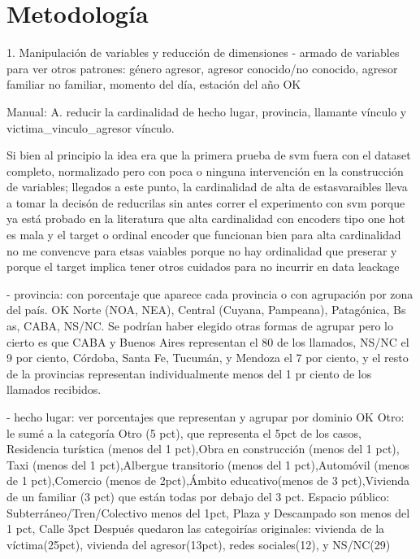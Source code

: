 \documentclass[10pt, spanish]{article}
\begin{document}
\section{Metodología}\label{met}


1. Manipulación de variables y reducción de dimensiones
- armado de variables para ver otros patrones: género agresor, agresor conocido/no conocido, agresor familiar no familiar, momento del día, estación del año OK

Manual:
A. reducir la cardinalidad de hecho lugar, provincia, llamante vínculo y victima_vinculo_agresor vínculo. 

Si bien al principio la idea era que la primera prueba de svm fuera con el dataset completo, normalizado pero con poca o ninguna intervención en la construcción de variables; llegados a este punto, la cardinalidad de alta de estasvaraibles lleva a tomar la decisón de reducrilas sin antes correr el experimento con svm porque ya está probado en la literatura que alta cardinalidad con encoders tipo one hot es mala y el target o ordinal encoder que funcionan bien para alta cardinalidad no me convencve para etsas vaiables porque no hay ordinalidad que preserar y porque el target implica tener otros cuidados para no incurrir en data leackage

- provincia: con porcentaje que aparece cada provincia o con agrupación por zona del país. OK
Norte (NOA, NEA), Central (Cuyana, Pampeana), Patagónica, Bs as, CABA, NS/NC. Se podrían haber elegido otras formas de agrupar pero lo cierto es que CABA y Buenos Aires representan el 80 de los llamados, NS/NC el 9 por ciento, Córdoba, Santa Fe, Tucumán, y Mendoza el 7 por ciento, y el resto de la provincias representan individualmente menos del 1 pr ciento de los llamados recibidos.

- hecho lugar: ver porcentajes que representan y agrupar por dominio OK
Otro: le sumé a la categoría Otro (5 pct), que representa el 5pct de los casos,  Residencia turística (menos del 1 pct),Obra en construcción (menos del 1 pct), Taxi (menos del 1 pct),Albergue transitorio (menos del 1 pct),Automóvil (menos de 1 pct),Comercio (menos de 2pct),Ámbito educativo(menos de 3 pct),Vivienda de un familiar (3 pct) que están todas por debajo del 3 pct.
Espacio público: Subterráneo/Tren/Colectivo menos del 1pct, Plaza y Descampado son menos del 1 pct, Calle 3pct
Después quedaron las categoirías originales: vivienda de la víctima(25pct), vivienda del agresor(13pct), redes sociales(12), y NS/NC(29)
\end{document}

